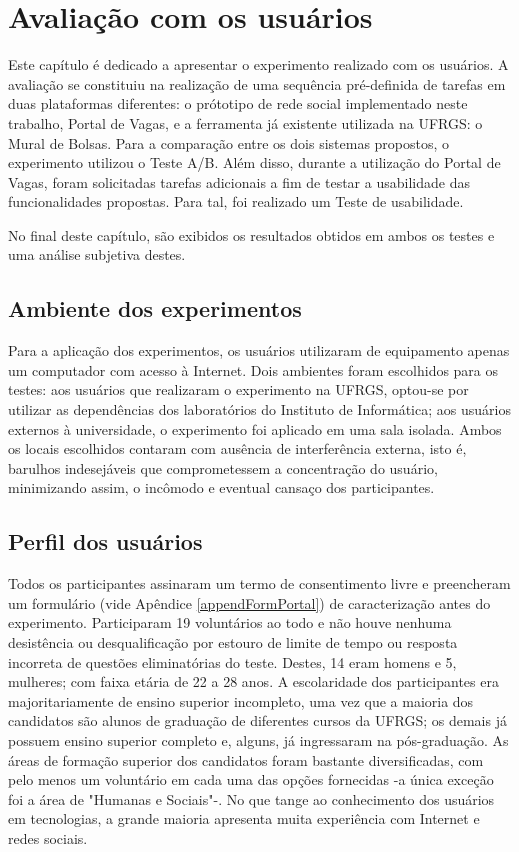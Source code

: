 \chapter{Avaliação com os usuários}
\label{Avaliação}

Este capítulo é dedicado a apresentar o experimento realizado com os usuários.  A avaliação se constituiu na realização de uma sequência pré-definida de tarefas em duas plataformas diferentes: o prótotipo de rede social implementado neste trabalho, Portal de Vagas, e a ferramenta já existente utilizada na UFRGS: o Mural de Bolsas. Para a comparação entre os dois sistemas propostos, o experimento utilizou o Teste A/B. Além disso, durante a utilização do Portal de Vagas, foram solicitadas tarefas adicionais a fim de testar a usabilidade das funcionalidades propostas. Para tal, foi realizado um Teste de usabilidade.

No final deste capítulo, são exibidos os resultados obtidos em ambos os testes e uma análise subjetiva destes.

\section{Ambiente dos experimentos}
\label{avaliacaoAmbiente}

Para a aplicação dos experimentos, os usuários utilizaram de equipamento apenas um computador com acesso à Internet. Dois ambientes foram escolhidos para os testes: aos usuários que realizaram o experimento na UFRGS, optou-se por utilizar as dependências dos laboratórios do Instituto de Informática; aos usuários externos à universidade, o experimento foi aplicado em uma sala isolada. Ambos os locais escolhidos contaram com ausência de interferência externa, isto é, barulhos indesejáveis que comprometessem a concentração do usuário, minimizando assim, o incômodo e eventual cansaço dos participantes.

\section{Perfil dos usuários}
\label{avaliacaoPefil}

Todos os participantes assinaram um termo de consentimento livre e preencheram um formulário (vide Apêndice \ref{appendFormPortal}) de caracterização antes do experimento. Participaram 19 voluntários ao todo e não houve nenhuma desistência ou desqualificação por estouro de limite de tempo ou resposta incorreta de questões eliminatórias do teste. Destes, 14 eram homens e 5, mulheres; com faixa etária de 22 a 28 anos. A escolaridade dos participantes era majoritariamente de ensino superior incompleto, uma vez que a maioria dos candidatos são alunos de graduação de diferentes cursos da UFRGS; os demais já possuem ensino superior completo e, alguns, já ingressaram na pós-graduação. As áreas de formação superior dos candidatos foram bastante diversificadas, com pelo menos um voluntário em cada uma das opções fornecidas -a única exceção foi a área de "Humanas e Sociais"-. No que tange ao conhecimento dos usuários em tecnologias, a grande maioria apresenta muita experiência com Internet e redes sociais. 


